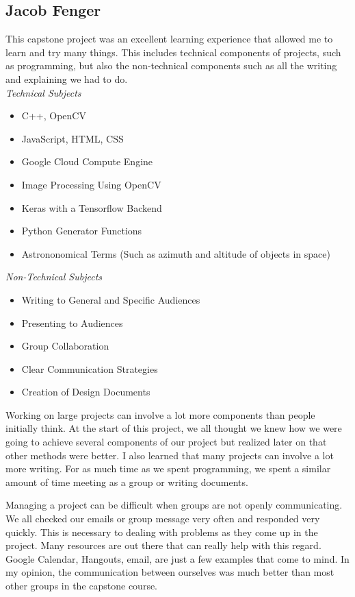\documentclass[10pt, onecolumn, draftclsnofoot, letterpaper, compsoc]{IEEEtran}
\begin{document}
\subsection{Jacob Fenger}

This capstone project was an excellent learning experience that allowed me to
learn and try many things. This includes technical components of projects, such
as programming, but also the non-technical components such as all the writing
and explaining we had to do. \\

\noindent \textit{Technical Subjects}
\begin{itemize}
    \item C++, OpenCV
    \item JavaScript, HTML, CSS
    \item Google Cloud Compute Engine
    \item Image Processing Using OpenCV
    \item Keras with a Tensorflow Backend
    \item Python Generator Functions
    \item Astrononomical Terms (Such as azimuth and altitude of objects in space) \\
\end{itemize}

\noindent \textit{Non-Technical Subjects}
\begin{itemize}
    \item Writing to General and Specific Audiences
    \item Presenting to Audiences
    \item Group Collaboration
    \item Clear Communication Strategies
    \item Creation of Design Documents \\
\end{itemize}

Working on large projects can involve a lot more components than people initially
think. At the start of this project, we all thought we knew how we were going to
achieve several components of our project but realized later on that other
methods were better. I also learned that many projects can involve a lot more
writing. For as much time as we spent programming, we spent a similar amount
of time meeting as a group or writing documents.

Managing a project can be difficult when groups are not openly communicating. We
all checked our emails or group message very often and responded very quickly.
This is necessary to dealing with problems as they come up in the project. Many
resources are out there that can really help with this regard. Google Calendar,
Hangouts, email, are just a few examples that come to mind. In my opinion, the
communication between ourselves was much better than most other groups in the
capstone course.
\end{document}
